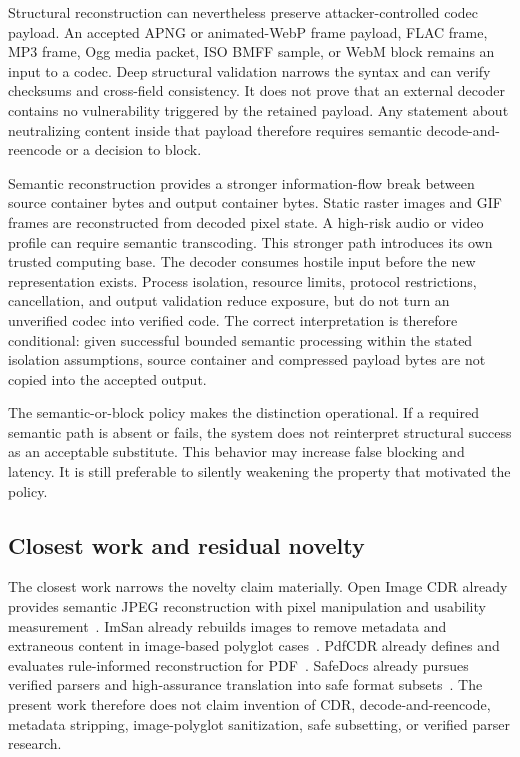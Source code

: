 Structural reconstruction can nevertheless preserve attacker-controlled codec
payload. An accepted APNG or animated-WebP frame payload, FLAC frame, MP3
frame, Ogg media packet, ISO BMFF sample, or WebM block remains an input to a codec. Deep structural validation narrows
the syntax and can verify checksums and cross-field consistency. It does not
prove that an external decoder contains no vulnerability triggered by the
retained payload. Any statement about neutralizing content inside that payload
therefore requires semantic decode-and-reencode or a decision to block.

Semantic reconstruction provides a stronger information-flow break between
source container bytes and output container bytes. Static raster images and GIF
frames are reconstructed from decoded pixel state. A high-risk audio or video
profile can require semantic transcoding. This stronger path introduces its own
trusted computing base. The decoder consumes hostile input before the new
representation exists. Process isolation, resource limits, protocol
restrictions, cancellation, and output validation reduce exposure, but do not
turn an unverified codec into verified code. The correct interpretation is
therefore conditional: given successful bounded semantic processing within the
stated isolation assumptions, source container and compressed payload bytes are
not copied into the accepted output.

The semantic-or-block policy makes the distinction operational. If a required
semantic path is absent or fails, the system does not reinterpret structural
success as an acceptable substitute. This behavior may increase false blocking
and latency. It is still preferable to silently weakening the property that
motivated the policy.

\subsection{Closest work and residual novelty}

The closest work narrows the novelty claim materially. Open Image CDR already
provides semantic JPEG reconstruction with pixel manipulation and usability
measurement~\cite{belkind2023}. ImSan already rebuilds images to remove
metadata and extraneous content in image-based polyglot cases~\cite{koch2025}.
PdfCDR already defines and evaluates rule-informed reconstruction for
PDF~\cite{dubin2023}. SafeDocs already pursues verified parsers and
high-assurance translation into safe format subsets~\cite{darpaSafeDocs}. The
present work therefore does not claim invention of CDR, decode-and-reencode,
metadata stripping, image-polyglot sanitization, safe subsetting, or verified
parser research.

